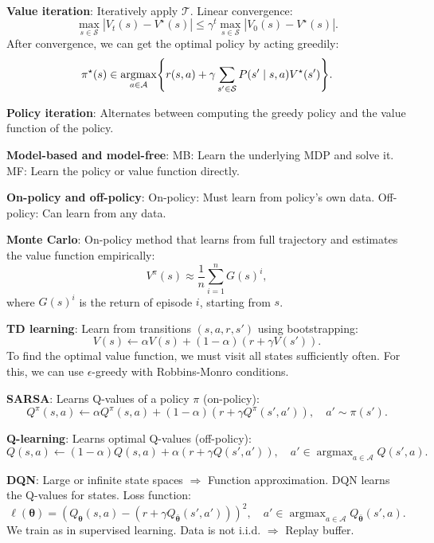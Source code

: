 \documentclass{article}
\DeclareMathOperator*{\argmax}{argmax}
\newcommand{\lft}{\mathopen{}\mathclose\bgroup\left}
\newcommand{\rgt}{\aftergroup\egroup\right}
\renewcommand{\vec}[1]{\bm{#1}}
\newenvironment{topic}[1]
{\textbf{\sffamily \colorbox{black}{\rlap{\textbf{\textcolor{white}{#1}}}\hspace{\linewidth}\hspace{-2\fboxsep}}} \\ \vspace{0.2cm}}
{}
\begin{document}
\begin{multicols*}{2}
\begin{topic}{Reinforcement learning}
        \textbf{Value iteration}: Iteratively apply $\mathcal{T}$. Linear convergence: \[
            \max_{s \in \mathcal{S}} |V_t(s) - V^\star(s)| \leq \gamma^t \max_{s \in \mathcal{S}} |V_0(s) - V^\star(s)|.
        \]
        After convergence, we can get the optimal policy by acting greedily: \[
            \pi^\star(s) \in \argmax_{a \in \mathcal{A}} \lft\{ r(s,a) + \gamma \sum_{s' \in \mathcal{S}} P(s' \mid s, a) V^\star(s') \rgt\}.
        \]

        \textbf{Policy iteration}: Alternates between computing the greedy policy and the value
        function of the policy.

        \textbf{Model-based and model-free}: MB: Learn the underlying MDP and solve it.
        MF: Learn the policy or value function directly.

        \textbf{On-policy and off-policy}: On-policy: Must learn from policy's own data. Off-policy:
        Can learn from any data.

        \textbf{Monte Carlo}: On-policy method that learns from full trajectory and estimates the value function empirically: \[
            V^\pi(s) \approx \frac{1}{n} \sum_{i=1}^{n} G(s)^i,
        \]
        where $G(s)^i$ is the return of episode $i$, starting from $s$.

        \textbf{TD learning}: Learn from transitions $(s, a, r, s')$ using bootstrapping: \[
            V(s) \gets \alpha V(s) + (1- \alpha) (r + \gamma V(s')).
        \]
        To find the optimal value function, we must visit all states sufficiently often. For this, we can
        use $\epsilon$-greedy with Robbins-Monro conditions.

        \textbf{SARSA}: Learns Q-values of a policy $\pi$ (on-policy): \[
            Q^\pi(s,a) \gets \alpha Q^\pi(s,a) + (1-\alpha) (r + \gamma Q^\pi(s', a')), \quad a' \sim \pi(s').
        \]

        \textbf{Q-learning}: Learns optimal Q-values (off-policy): \[
            Q(s,a) \gets (1-\alpha) Q(s,a) + \alpha (r + \gamma Q(s',a')), \quad a' \in \argmax_{a \in \mathcal{A}} Q(s', a).
        \]

        \textbf{DQN}: Large or infinite state spaces $\Rightarrow$ Function approximation. DQN learns
        the Q-values for states. Loss function: \[
            \ell(\vec{\theta}) = (Q_{\vec{\theta}}(s,a) - (r + \gamma Q_{\bar{\vec{\theta}}}(s', a')))^2, \quad a' \in \argmax_{a \in \mathcal{A}} Q_{\bar{\vec{\theta}}}(s', a).
        \]
        We train as in supervised learning. Data is not i.i.d. $\Rightarrow$ Replay buffer.


\end{topic}
\end{multicols*}
\end{document}
